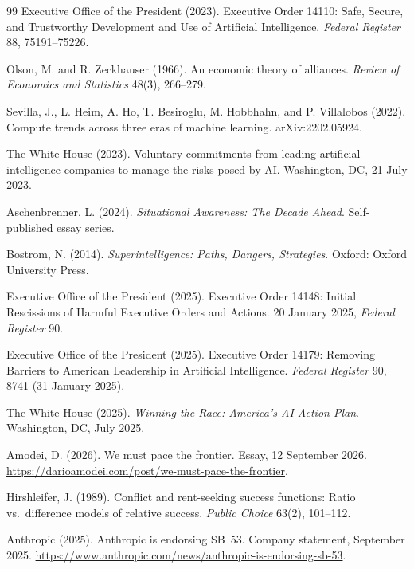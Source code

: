 \documentclass[11pt]{article}
\theoremstyle{plain}
\theoremstyle{definition}
\theoremstyle{remark}
\begin{document}
\begin{thebibliography}{99}
 Executive Office of the President (2023). Executive Order 14110: Safe, Secure, and Trustworthy Development and Use of Artificial Intelligence. \emph{Federal Register} 88, 75191--75226.

 Olson, M. and R. Zeckhauser (1966). An economic theory of alliances. \emph{Review of Economics and Statistics} 48(3), 266--279.

 Sevilla, J., L. Heim, A. Ho, T. Besiroglu, M. Hobbhahn, and P. Villalobos (2022). Compute trends across three eras of machine learning. arXiv:2202.05924.

 The White House (2023). Voluntary commitments from leading artificial intelligence companies to manage the risks posed by AI. Washington, DC, 21 July 2023.


 Aschenbrenner, L. (2024). \emph{Situational Awareness: The Decade Ahead}. Self-published essay series.

 Bostrom, N. (2014). \emph{Superintelligence: Paths, Dangers, Strategies}. Oxford: Oxford University Press.

 Executive Office of the President (2025). Executive Order 14148: Initial Rescissions of Harmful Executive Orders and Actions. 20 January 2025, \emph{Federal Register} 90.

 Executive Office of the President (2025). Executive Order 14179: Removing Barriers to American Leadership in Artificial Intelligence. \emph{Federal Register} 90, 8741 (31 January 2025).

 The White House (2025). \emph{Winning the Race: America's AI Action Plan}. Washington, DC, July 2025.


 Amodei, D. (2026). We must pace the frontier. Essay, 12 September 2026. \url{https://darioamodei.com/post/we-must-pace-the-frontier}.

 Hirshleifer, J. (1989). Conflict and rent-seeking success functions: Ratio vs.\ difference models of relative success. \emph{Public Choice} 63(2), 101--112.


 Anthropic (2025). Anthropic is endorsing SB~53. Company statement, September 2025. \url{https://www.anthropic.com/news/anthropic-is-endorsing-sb-53}.


\end{thebibliography}
\end{document}
